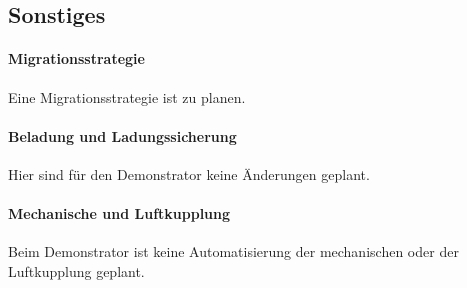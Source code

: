 \subsection{Sonstiges}
\paragraph{Migrationsstrategie}
\begin{feat}
Eine Migrationsstrategie ist zu planen.
\end{feat}
\paragraph{Beladung und Ladungssicherung}
Hier sind für den \gls{Demonstrator} keine Änderungen geplant.
\paragraph{Mechanische und Luftkupplung}
Beim \gls{Demonstrator} ist keine Automatisierung der mechanischen oder der Luftkupplung geplant.
